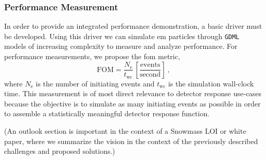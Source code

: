 \documentclass[10pt]{article}
\begin{document}
\subsubsection*{Performance Measurement}

In order to provide an integrated performance demonstration, a basic driver must be developed. Using this driver we can
simulate \ac{em} particles through \texttt{GDML} models of increasing
complexity to measure and analyze performance. For performance
measurements, we propose the \ac{fom} metric,
\begin{equation}
  \textrm{FOM} = \frac{N_\textrm{e}}{t_{\textrm{wc}}}\,
  \left[\frac{\textrm{events}}{\textrm{second}}\right]\:,
\end{equation}
where $N_\textrm{e}$ is the number of initiating events and
$t_\textrm{wc}$ is the simulation wall-clock time. This measurement is
of most direct relevance to detector response use-cases because the
objective is to simulate as many initiating events as possible in order
to assemble a statistically meaningful detector response function.

(An outlook section is important in the context of a Snowmass LOI or white paper, where we summarize the vision in the context of the previously described challenges and proposed solutions.)
\pagebreak
\printbibliography

\end{document}
